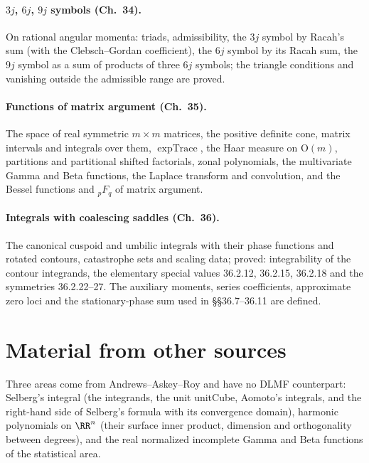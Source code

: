 \documentclass[11pt,a4paper]{article}
\begin{document}
\paragraph{$3j$, $6j$, $9j$ symbols (Ch.~34).} On rational angular momenta: triads, admissibility,
the $3j$ symbol by Racah's sum (with the Clebsch--Gordan coefficient), the $6j$ symbol by its Racah
sum, the $9j$ symbol as a sum of products of three $6j$ symbols; the triangle conditions and vanishing
outside the admissible range are proved.

\paragraph{Functions of matrix argument (Ch.~35).} The space of real symmetric $m\times m$ matrices,
the positive definite cone, matrix intervals and integrals over them, $\operatorname{expTrace}$, the Haar
measure on $\mathrm O(m)$, partitions and partitional shifted factorials, zonal polynomials, the
multivariate Gamma and Beta functions, the Laplace transform and convolution, and the Bessel
functions and ${}_pF_q$ of matrix argument.

\paragraph{Integrals with coalescing saddles (Ch.~36).} The canonical cuspoid and umbilic integrals
with their phase functions and rotated contours, catastrophe sets and scaling data; proved:
integrability of the contour integrands, the elementary special values 36.2.12, 36.2.15, 36.2.18 and
the symmetries 36.2.22--27. The auxiliary moments, series coefficients, approximate zero loci and the
stationary-phase sum used in \S\S36.7--36.11 are defined.

\section{Material from other sources}

Three areas come from Andrews--Askey--Roy and have no DLMF counterpart: Selberg's integral (the
integrands, the unit unitCube, Aomoto's integrals, and the right-hand side of Selberg's formula with its
convergence domain), harmonic polynomials on $\RR^n$ (their surface inner product, dimension and
orthogonality between degrees), and the real normalized incomplete Gamma and Beta functions of the
statistical area.
\end{document}
